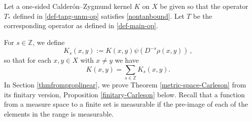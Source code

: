 


Let a one-sided Calder\'on--Zygmund kernel $K$ on $X$ be given so that the operator $T_*$ defined in \eqref{def-tang-unm-op}
satisfies
\eqref{nontanbound}. Let $T$ be the corresponding operator as defined in \eqref{def-main-op}.


For $s\in\mathbb{Z}$, we define
\begin{equation}\label{defks}
    K_s(x,y):=K(x,y)\psi(D^{-s}\rho(x,y))\,,
\end{equation}
so that for each $x, y \in X$ with $x\neq y$  we have
$$K(x,y)=\sum_{s\in\mathbb{Z}}K_s(x,y).$$
 In Section \ref{thmfromproplinear}, we prove Theorem \ref{metric-space-Carleson}
 from its finitary version, Proposition \ref{finitary-Carleson} below. Recall
 that a function from a measure space to a finite set is measurable if the pre-image of each of the elements in the range is measurable.


